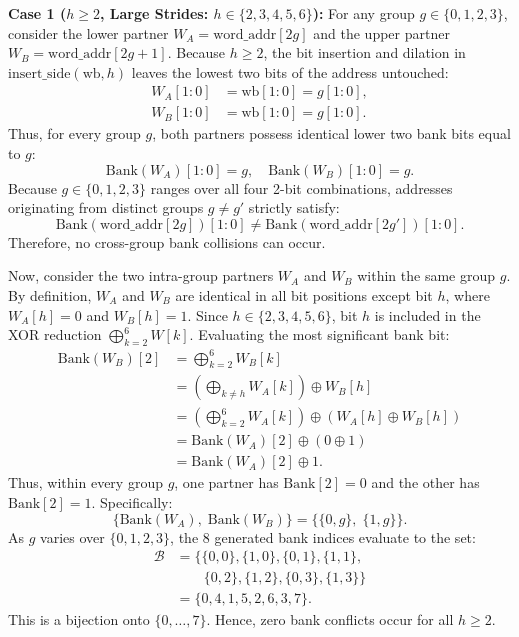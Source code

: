 \textbf{Case 1 ($h \ge 2$, Large Strides: $h \in \{2, 3, 4, 5, 6\}$):}
For any group $g \in \{0, 1, 2, 3\}$, consider the lower partner $W_A = \text{word\_addr}[2g]$ and the upper partner $W_B = \text{word\_addr}[2g+1]$. Because $h \ge 2$, the bit insertion and dilation in $\text{insert\_side}(\text{wb}, h)$ leaves the lowest two bits of the address untouched:
\begin{align}
W_A[1:0] &= \text{wb}[1:0] = g[1:0], \\
W_B[1:0] &= \text{wb}[1:0] = g[1:0].
\end{align}
Thus, for every group $g$, both partners possess identical lower two bank bits equal to $g$:
\begin{equation}
\text{Bank}(W_A)[1:0] = g, \quad \text{Bank}(W_B)[1:0] = g.
\end{equation}
Because $g \in \{0, 1, 2, 3\}$ ranges over all four 2-bit combinations, addresses originating from distinct groups $g \neq g'$ strictly satisfy:
\begin{equation}
\text{Bank}(\text{word\_addr}[2g])[1:0] \neq \text{Bank}(\text{word\_addr}[2g'])[1:0].
\end{equation}
Therefore, no cross-group bank collisions can occur.

Now, consider the two intra-group partners $W_A$ and $W_B$ within the same group $g$. By definition, $W_A$ and $W_B$ are identical in all bit positions except bit $h$, where $W_A[h] = 0$ and $W_B[h] = 1$. Since $h \in \{2, 3, 4, 5, 6\}$, bit $h$ is included in the XOR reduction $\bigoplus_{k=2}^6 W[k]$. Evaluating the most significant bank bit:
\begin{align}
\text{Bank}(W_B)[2] &= \bigoplus_{k=2}^{6} W_B[k] \nonumber \\
&= \left( \bigoplus_{k \neq h} W_A[k] \right) \oplus W_B[h] \nonumber \\
&= \left( \bigoplus_{k=2}^{6} W_A[k] \right) \oplus (W_A[h] \oplus W_B[h]) \nonumber \\
&= \text{Bank}(W_A)[2] \oplus (0 \oplus 1) \nonumber \\
&= \text{Bank}(W_A)[2] \oplus 1.
\end{align}
Thus, within every group $g$, one partner has $\text{Bank}[2] = 0$ and the other has $\text{Bank}[2] = 1$. Specifically:
\begin{equation}
\{\text{Bank}(W_A), \; \text{Bank}(W_B)\} = \{\{0, g\}, \; \{1, g\}\}.
\end{equation}
As $g$ varies over $\{0, 1, 2, 3\}$, the 8 generated bank indices evaluate to the set:
\begin{align}
\mathcal{B} &= \{\{0, 0\}, \{1, 0\}, \{0, 1\}, \{1, 1\}, \nonumber \\
&\quad\quad \{0, 2\}, \{1, 2\}, \{0, 3\}, \{1, 3\}\} \nonumber \\
&= \{0, 4, 1, 5, 2, 6, 3, 7\}.
\end{align}
This is a bijection onto $\{0, \dots, 7\}$. Hence, zero bank conflicts occur for all $h \ge 2$.

